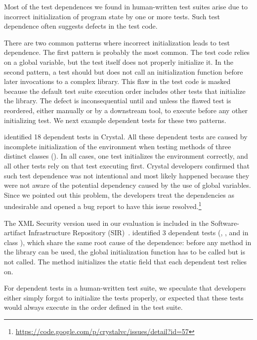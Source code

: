 
Most of the test dependences we found in human-written
test suites arise due to incorrect initialization
of program state by one or more tests. Such test
dependence often suggests defects in the
test code. 

There are two common patterns where incorrect
initialization leads to test dependence.
The first pattern is probably the most common. 
The test code relies on a
global variable, but the test itself does
not properly initialize it.  In the second pattern,
a test should but does not call
an initialization function before later invocations to a complex library.
This flaw in the test code is masked because the default test suite execution
order includes other tests that initialize the library.  The defect is
inconsequential until and unless the flawed test is reordered, either manually or by
a downstream tool, to execute before any other initializing test.
We next example dependent tests for these two patterns.



%
\ourtool identified 18 dependent tests in Crystal.
All these dependent tests
are caused by incomplete initialization of the
environment when testing methods of three distinct classes
().
In all cases, one test initializes the environment correctly, and all
other tests rely on that test executing first. 
Crystal developers confirmed that such test dependence was not
intentional and most likely happened because they were not
aware of the potential dependency caused by the use of global
variables. Since we pointed out this problem, the developers treat the
dependencies as undesirable and opened a bug report to have this issue
resolved.\footnote{\url{https://code.google.com/p/crystalvc/issues/detail?id=57}}


The XML Security version used in our evaluation is included
in the Soft\-ware-artifact
Infrastructure Repository (SIR)~\cite{sir}. \ourtool identified
3 dependent tests (, , and 
in class ), which share the same root
cause of the dependence: before any
method in the library can be used, the global initialization function 
 has to be called but is not called. The
 method initializes the static field that
each dependent test relies on.

For dependent tests in a human-written test suite, we speculate that
developers either simply forgot to
initialize the tests properly, or expected that these tests would always execute
in the order defined
in the test suite.

